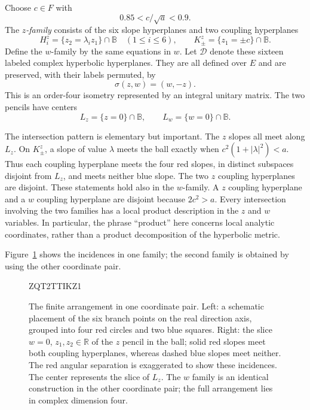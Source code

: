 \documentclass[11pt,reqno]{amsart}
\numberwithin{equation}{section}
\theoremstyle{definition}
\theoremstyle{remark}
\begin{document}
Choose $c\in F$ with
\begin{equation}\label{geo:coupling-size}
                 0.85<c/\sqrt a<0.9.
\end{equation}
The \emph{$z$-family} consists of the six slope hyperplanes and two
coupling hyperplanes
\[
 H^z_i=\{z_2=\lambda_i z_1\}\cap\mathbb B\quad(1\le i\le6),
 \qquad K^z_\pm=\{z_1=\pm c\}\cap\mathbb B.
\]
Define the $w$-family by the same equations in $w$.  Let $\mathcal D$ denote
these sixteen labeled complex hyperbolic hyperplanes.  They are all
defined over $E$ and are preserved, with their labels permuted, by
\begin{equation}\label{geo:sigma}
                    \sigma(z,w)=(w,-z).
\end{equation}
This is an order-four isometry represented by an integral unitary
matrix.  The two pencils have centers
\[
 L_z=\{z=0\}\cap\mathbb B,
 \qquad L_w=\{w=0\}\cap\mathbb B.
\]

The intersection pattern is elementary but important.  The $z$ slopes
all meet along $L_z$.  On $K^z_\pm$, a slope of value $\lambda$ meets the
ball exactly when $c^2(1+|\lambda|^2)<a$.  Thus each coupling hyperplane
meets the four red slopes, in distinct subspaces disjoint from $L_z$,
and meets neither blue slope.  The two $z$ coupling hyperplanes are
disjoint.  These statements hold also in the $w$-family.  A $z$ coupling
hyperplane and a $w$ coupling hyperplane are disjoint because $2c^2>a$.
Every intersection involving the two families has a local product
description in the $z$ and $w$ variables.  In particular, the phrase
``product'' here concerns local analytic coordinates, rather than a
product decomposition of the hyperbolic metric.

Figure~\ref{fig:arrangement} shows the incidences in one family; the
second family is obtained by using the other coordinate pair.
\begin{figure}[htbp]

\begingroup
{}
ZQT2TTIKZ1
\endgroup
\caption{The finite arrangement in one coordinate pair. Left: a
  schematic placement of the six branch points on the real direction
  axis, grouped into four red circles and two blue squares. Right:
  the slice $w=0$, $z_1,z_2\in\mathbb R$ of the $z$ pencil in the
  ball; solid red slopes meet both coupling
  hyperplanes, whereas dashed blue slopes meet neither. The red
  angular separation is exaggerated to show these incidences.
  The center represents the slice of $L_z$. The $w$ family is an
  identical construction in the other coordinate pair; the full
  arrangement lies in complex dimension four.}
\label{fig:arrangement}
\end{figure}
\end{document}
